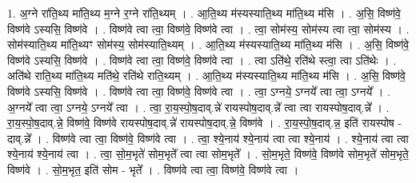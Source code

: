 \documentclass[17pt]{extarticle}
\begin{document}
1. अ॒ग्ने रा॑ति॒थ्य मा॑ति॒थ्य म॒ग्ने र॒ग्ने रा॑ति॒थ्यम् । . आ॒ति॒थ्य म॑स्यस्याति॒थ्य मा॑ति॒थ्य म॑सि । . अ॒सि॒ विष्ण॑वे॒ विष्ण॑वे ऽस्यसि॒ विष्ण॑वे । . विष्ण॑वे त्वा त्वा॒ विष्ण॑वे॒ विष्ण॑वे त्वा । . त्वा॒ सोम॑स्य॒ सोम॑स्य त्वा त्वा॒ सोम॑स्य । . सोम॑स्याति॒थ्य मा॑ति॒थ्यꣳ सोम॑स्य॒ सोम॑स्याति॒थ्यम् । . आ॒ति॒थ्य म॑स्यस्याति॒थ्य मा॑ति॒थ्य म॑सि । . अ॒सि॒ विष्ण॑वे॒ विष्ण॑वे ऽस्यसि॒ विष्ण॑वे । . विष्ण॑वे त्वा त्वा॒ विष्ण॑वे॒ विष्ण॑वे त्वा । . त्वा ऽति॑थे॒ रति॑थे स्त्वा॒ त्वा ऽति॑थेः । . अति॑थे राति॒थ्य मा॑ति॒थ्य मति॑थे॒ रति॑थे राति॒थ्यम् । . आ॒ति॒थ्य म॑स्यस्याति॒थ्य मा॑ति॒थ्य म॑सि । . अ॒सि॒ विष्ण॑वे॒ विष्ण॑वे ऽस्यसि॒ विष्ण॑वे । . विष्ण॑वे त्वा त्वा॒ विष्ण॑वे॒ विष्ण॑वे त्वा । . त्वा॒ ऽग्नये॒ ऽग्नये᳚ त्वा त्वा॒ ऽग्नये᳚ । . अ॒ग्नये᳚ त्वा त्वा॒ ऽग्नये॒ ऽग्नये᳚ त्वा । . त्वा॒ रा॒य॒स्पो॒ष॒दाव्.न्ने॑ रायस्पोष॒दाव्.न्ने᳚ त्वा त्वा रायस्पोष॒दाव्.न्ने᳚ । . रा॒य॒स्पो॒ष॒दाव्.न्ने॒ विष्ण॑वे॒ विष्ण॑वे रायस्पोष॒दाव्.न्ने॑ रायस्पोष॒दाव्.न्ने॒ विष्ण॑वे । . रा॒य॒स्पो॒ष॒दाव्.न्न॒ इति॑ रायस्पोष - दाव्.न्ने᳚ । . विष्ण॑वे त्वा त्वा॒ विष्ण॑वे॒ विष्ण॑वे त्वा । . त्वा॒ श्ये॒नाय॑ श्ये॒नाय॑ त्वा त्वा श्ये॒नाय॑ । . श्ये॒नाय॑ त्वा त्वा श्ये॒नाय॑ श्ये॒नाय॑ त्वा । . त्वा॒ सो॒म॒भृते॑ सोम॒भृते᳚ त्वा त्वा सोम॒भृते᳚ । . सो॒म॒भृते॒ विष्ण॑वे॒ विष्ण॑वे सोम॒भृते॑ सोम॒भृते॒ विष्ण॑वे । . सो॒म॒भृत॒ इति॑ सोम - भृते᳚ । . विष्ण॑वे त्वा त्वा॒ विष्ण॑वे॒ विष्ण॑वे त्वा । \newline
\end{document}
